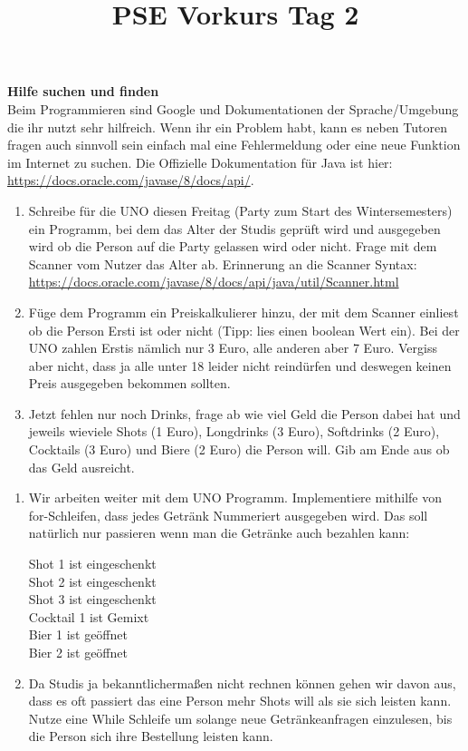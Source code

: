 \documentclass{../../sheet}
\title{PSE Vorkurs Tag 2}
\begin{document}
\maketitle

\textbf{Hilfe suchen und finden}\\
Beim Programmieren sind Google und Dokumentationen der Sprache/Umgebung die ihr nutzt sehr hilfreich. Wenn ihr ein Problem habt, kann es neben Tutoren fragen auch sinnvoll sein einfach mal eine Fehlermeldung oder eine neue Funktion im Internet zu suchen. Die Offizielle Dokumentation für Java ist hier: \url{https://docs.oracle.com/javase/8/docs/api/}.

\newpage
{}
\begin{enumerate}
    \item Schreibe für die UNO diesen Freitag (Party zum Start des Wintersemesters) ein Programm, bei dem das Alter der Studis geprüft wird und ausgegeben wird ob die Person auf die Party gelassen wird oder nicht. Frage mit dem Scanner vom Nutzer das Alter ab. Erinnerung an die Scanner Syntax:\\ \url{https://docs.oracle.com/javase/8/docs/api/java/util/Scanner.html}
    \item Füge dem Programm ein Preiskalkulierer hinzu, der mit dem Scanner einliest ob die Person Ersti ist oder nicht (Tipp: lies einen boolean Wert ein). Bei der UNO zahlen Erstis nämlich nur 3 Euro, alle anderen aber 7 Euro. Vergiss aber nicht, dass ja alle unter 18 leider nicht reindürfen und deswegen keinen Preis ausgegeben bekommen sollten.
    \item Jetzt fehlen nur noch Drinks, frage ab wie viel Geld die Person dabei hat und jeweils wieviele Shots (1 Euro), Longdrinks (3 Euro), Softdrinks (2 Euro), Cocktails (3 Euro) und Biere (2 Euro) die Person will. Gib am Ende aus ob das Geld ausreicht.
\end{enumerate}

\newpage
{}
\begin{enumerate}
    \item Wir arbeiten weiter mit dem UNO Programm. Implementiere mithilfe von for-Schleifen, dass jedes Getränk Nummeriert ausgegeben wird. Das soll natürlich nur passieren wenn man die Getränke auch bezahlen kann:
          \begin{ausgabe}
              Shot 1 ist  eingeschenkt\\
              Shot 2 ist  eingeschenkt\\
              Shot 3 ist  eingeschenkt\\
              Cocktail 1 ist  Gemixt\\
              Bier 1 ist geöffnet\\
              Bier 2 ist geöffnet
          \end{ausgabe}
    \item Da Studis ja bekanntlichermaßen nicht rechnen können gehen wir davon aus, dass es oft passiert das eine Person mehr Shots will als sie sich leisten kann. Nutze eine While Schleife um solange neue Getränkeanfragen einzulesen, bis die Person sich ihre Bestellung leisten kann.
\end{enumerate}
\end{document}
